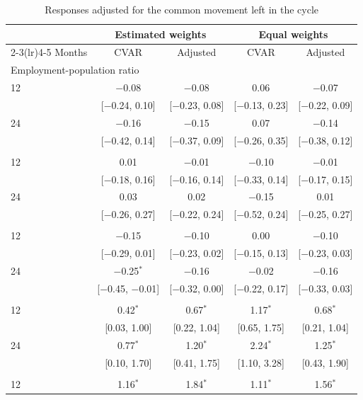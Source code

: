 \begin{table}[htbp]
\centering
\caption{Responses adjusted for the common movement left in the cycle\label{tab:ak-adjusted}}
\footnotesize
\begin{tabular}{lcccc}
\toprule
 & \multicolumn{2}{c}{Estimated weights} & \multicolumn{2}{c}{Equal weights} \\
\cmidrule(lr){2-3}\cmidrule(lr){4-5}
Months & CVAR & Adjusted & CVAR & Adjusted \\
\midrule
\multicolumn{5}{l}{Employment-population ratio} \\
12 & $-$0.08 & $-$0.08 & 0.06 & $-$0.07 \\
 & [$-$0.24, 0.10] & [$-$0.23, 0.08] & [$-$0.13, 0.23] & [$-$0.22, 0.09] \\
24 & $-$0.16 & $-$0.15 & 0.07 & $-$0.14 \\
 & [$-$0.42, 0.14] & [$-$0.37, 0.09] & [$-$0.26, 0.35] & [$-$0.38, 0.12] \\
\addlinespace
\multicolumn{5}{l}{Unemployment rate} \\
12 & 0.01 & $-$0.01 & $-$0.10 & $-$0.01 \\
 & [$-$0.18, 0.16] & [$-$0.16, 0.14] & [$-$0.33, 0.14] & [$-$0.17, 0.15] \\
24 & 0.03 & 0.02 & $-$0.15 & 0.01 \\
 & [$-$0.26, 0.27] & [$-$0.22, 0.24] & [$-$0.52, 0.24] & [$-$0.25, 0.27] \\
\addlinespace
\multicolumn{5}{l}{Participation rate} \\
12 & $-$0.15 & $-$0.10 & 0.00 & $-$0.10 \\
 & [$-$0.29, 0.01] & [$-$0.23, 0.02] & [$-$0.15, 0.13] & [$-$0.23, 0.03] \\
24 & $-$0.25$^{*}$ & $-$0.16 & $-$0.02 & $-$0.16 \\
 & [$-$0.45, $-$0.01] & [$-$0.32, 0.00] & [$-$0.22, 0.17] & [$-$0.33, 0.03] \\
\addlinespace
\multicolumn{5}{l}{Payroll employment} \\
12 & 0.42$^{*}$ & 0.67$^{*}$ & 1.17$^{*}$ & 0.68$^{*}$ \\
 & [0.03, 1.00] & [0.22, 1.04] & [0.65, 1.75] & [0.21, 1.04] \\
24 & 0.77$^{*}$ & 1.20$^{*}$ & 2.24$^{*}$ & 1.25$^{*}$ \\
 & [0.10, 1.70] & [0.41, 1.75] & [1.10, 3.28] & [0.43, 1.90] \\
\addlinespace
\multicolumn{5}{l}{Leisure and hospitality} \\
12 & 1.16$^{*}$ & 1.84$^{*}$ & 1.11$^{*}$ & 1.56$^{*}$ \\

\end{tabular}
\end{table}
